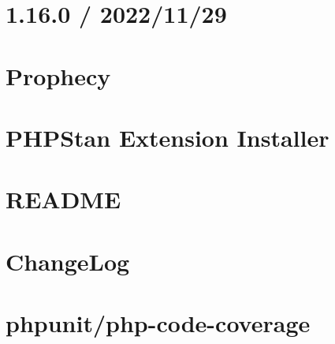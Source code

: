 \documentclass[twoside]{book}
\newcommand{\+}{\discretionary{\mbox{\scriptsize$\hookleftarrow$}}{}{}}
\begin{document}
\chapter{1.16.0 / 2022/11/29}
\label{md__c__workspace__proyecto__p_h_p_project_vendor_phpspec_prophecy__c_h_a_n_g_e_s}

\chapter{Prophecy}
\label{md__c__workspace__proyecto__p_h_p_project_vendor_phpspec_prophecy__r_e_a_d_m_e}

\chapter{PHPStan Extension Installer}
\label{md__c__workspace__proyecto__p_h_p_project_vendor_phpstan_extension_installer__r_e_a_d_m_e}

\chapter{README}
\label{md__c__workspace__proyecto__p_h_p_project_vendor_phpstan_phpstan__r_e_a_d_m_e}

\chapter{Change\+Log}
\label{md__c__workspace__proyecto__p_h_p_project_vendor_phpunit_php_code_coverage__change_log}

\chapter{phpunit/php-\/code-\/coverage}
\label{md__c__workspace__proyecto__p_h_p_project_vendor_phpunit_php_code_coverage__r_e_a_d_m_e}

\end{document}
